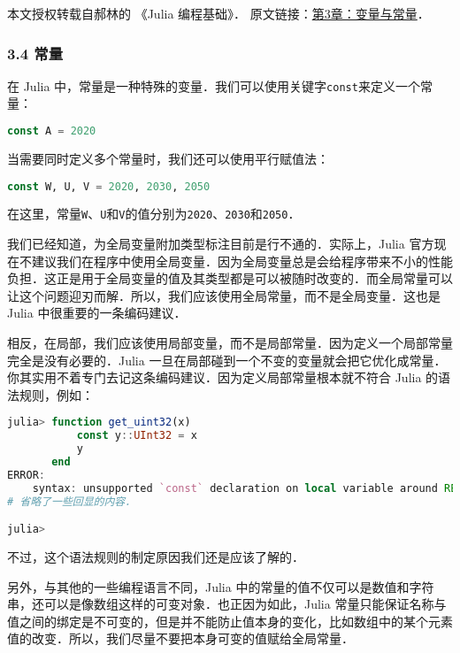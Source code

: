 
本文授权转载自郝林的 《Julia 编程基础》． 原文链接：\href{https://github.com/hyper0x/JuliaBasics/blob/master/book/ch03.md}{第3章：变量与常量}．


\subsubsection{3.4 常量}

在 Julia 中，常量是一种特殊的变量．我们可以使用关键字\verb|const|来定义一个常量：

\begin{lstlisting}[language=julia]
const A = 2020
\end{lstlisting}

当需要同时定义多个常量时，我们还可以使用平行赋值法：

\begin{lstlisting}[language=julia]
const W, U, V = 2020, 2030, 2050
\end{lstlisting}

在这里，常量\verb|W|、\verb|U|和\verb|V|的值分别为\verb|2020|、\verb|2030|和\verb|2050|．

我们已经知道，为全局变量附加类型标注目前是行不通的．实际上，Julia 官方现在不建议我们在程序中使用全局变量．因为全局变量总是会给程序带来不小的性能负担．这正是用于全局变量的值及其类型都是可以被随时改变的．而全局常量可以让这个问题迎刃而解．所以，我们应该使用全局常量，而不是全局变量．这也是 Julia 中很重要的一条编码建议．

相反，在局部，我们应该使用局部变量，而不是局部常量．因为定义一个局部常量完全是没有必要的．Julia 一旦在局部碰到一个不变的变量就会把它优化成常量．你其实用不着专门去记这条编码建议．因为定义局部常量根本就不符合 Julia 的语法规则，例如：

\begin{lstlisting}[language=julia]
julia> function get_uint32(x)
           const y::UInt32 = x
           y
       end
ERROR: 
    syntax: unsupported `const` declaration on local variable around REPL[1]:2
# 省略了一些回显的内容．

julia> 
\end{lstlisting}

不过，这个语法规则的制定原因我们还是应该了解的．

另外，与其他的一些编程语言不同，Julia 中的常量的值不仅可以是数值和字符串，还可以是像数组这样的可变对象．也正因为如此，Julia 常量只能保证名称与值之间的绑定是不可变的，但是并不能防止值本身的变化，比如数组中的某个元素值的改变．所以，我们尽量不要把本身可变的值赋给全局常量．

